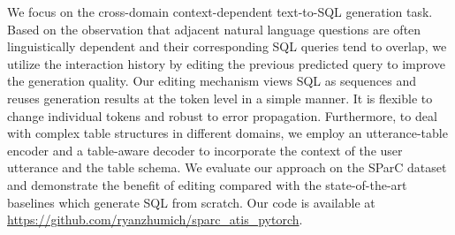 We focus on the cross-domain context-dependent text-to-SQL generation task.
Based on the observation that adjacent natural language questions are often linguistically dependent and their corresponding SQL queries tend to overlap, we utilize the interaction history by editing the previous predicted query to improve the generation quality.
Our editing mechanism views SQL as sequences and reuses generation results at the token level in a simple manner.
It is flexible to change individual tokens and robust to error propagation.
Furthermore, to deal with complex table structures in different domains, we employ an utterance-table encoder and a table-aware decoder to incorporate the context of the user utterance and the table schema.
We evaluate our approach on the SParC dataset and demonstrate the benefit of editing compared with the state-of-the-art baselines which generate SQL from scratch.
Our code is available at \url{https://github.com/ryanzhumich/sparc\_atis\_pytorch}.